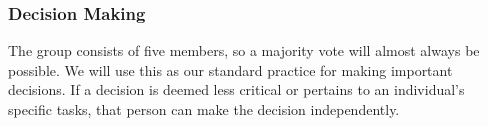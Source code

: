 \documentclass{article}
\begin{document}
\subsubsection*{Decision Making} 

The group consists of five members, so a majority vote will almost always be possible. We will use this as our standard practice for making important decisions. If a decision is deemed less critical or pertains to an individual's specific tasks, that person can make the decision independently.
\end{document}
